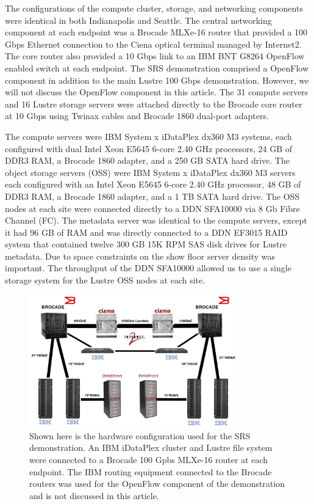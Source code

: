 \documentclass[]{sigplan-proc}
\begin{document}
The configurations of the compute cluster, storage, and networking components were identical in both
Indianapolis and Seattle. The central networking component at each endpoint was a Brocade MLXe-16 router that
provided a 100 Gbps Ethernet connection to the Ciena optical terminal managed by Internet2. The core router
also provided a 10 Gbps link to an IBM BNT G8264 OpenFlow enabled switch at each endpoint. The SRS
demonstration comprised a OpenFlow component in addition to the main Lustre 100 Gbps demonstration. However,
we will not discuss the OpenFlow component in this article. The 31 compute servers and 16 Lustre storage
servers were attached directly to the Brocade core router at 10 Gbps using Twinax cables and Brocade 1860
dual-port adapters.

The compute servers were IBM System x iDataPlex dx360 M3 systems, each configured with dual Intel Xeon E5645
6-core 2.40 GHz processors, 24 GB of DDR3 RAM, a Brocade 1860 adapter, and a 250 GB SATA hard drive. The
object storage servers (OSS) were IBM System x iDataPlex dx360 M3 servers each configured with an Intel Xeon
E5645 6-core 2.40 GHz processor, 48 GB of DDR3 RAM, a Brocade 1860 adapter, and a 1 TB SATA hard drive. The
OSS nodes at each site were connected directly to a DDN SFA10000 via 8 Gb Fibre Channel (FC). The metadata
server was identical to the compute servers, except it had 96 GB of RAM and was directly connected to a DDN
EF3015 RAID system that contained twelve 300 GB 15K RPM SAS disk drives for Lustre metadata. Due to space
constraints on the show floor server density was important. The throughput of the DDN SFA10000 allowed us to
use a single storage system for the Lustre OSS nodes at each site.

\begin{figure}[t]
\begin{center}
\includegraphics[width=0.80\textwidth]{figures/hardware.png}
\caption{Shown here is the hardware configuration used for the SRS demonstration. An IBM iDataPlex cluster and
  Lustre file system were connected to a Brocade 100 Gpbs MLXe-16 router at each endpoint. The IBM routing
  equipment connected to the Brocade routers was used for the OpenFlow component of the demonstration and is
  not discussed in this article. }
\label{fig:hardwaresetup}
\end{center}
\end{figure}
\end{document}
